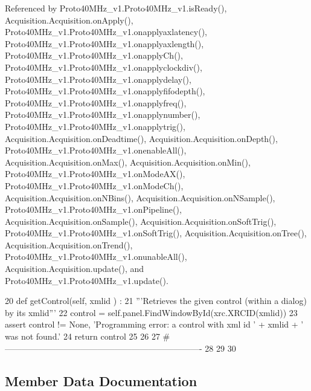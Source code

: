 Referenced by Proto40\+M\+Hz\+\_\+v1.\+Proto40\+M\+Hz\+\_\+v1.\+is\+Ready(), Acquisition.\+Acquisition.\+on\+Apply(), Proto40\+M\+Hz\+\_\+v1.\+Proto40\+M\+Hz\+\_\+v1.\+onapplyaxlatency(), Proto40\+M\+Hz\+\_\+v1.\+Proto40\+M\+Hz\+\_\+v1.\+onapplyaxlength(), Proto40\+M\+Hz\+\_\+v1.\+Proto40\+M\+Hz\+\_\+v1.\+onapply\+Ch(), Proto40\+M\+Hz\+\_\+v1.\+Proto40\+M\+Hz\+\_\+v1.\+onapplyclockdiv(), Proto40\+M\+Hz\+\_\+v1.\+Proto40\+M\+Hz\+\_\+v1.\+onapplydelay(), Proto40\+M\+Hz\+\_\+v1.\+Proto40\+M\+Hz\+\_\+v1.\+onapplyfifodepth(), Proto40\+M\+Hz\+\_\+v1.\+Proto40\+M\+Hz\+\_\+v1.\+onapplyfreq(), Proto40\+M\+Hz\+\_\+v1.\+Proto40\+M\+Hz\+\_\+v1.\+onapplynumber(), Proto40\+M\+Hz\+\_\+v1.\+Proto40\+M\+Hz\+\_\+v1.\+onapplytrig(), Acquisition.\+Acquisition.\+on\+Deadtime(), Acquisition.\+Acquisition.\+on\+Depth(), Proto40\+M\+Hz\+\_\+v1.\+Proto40\+M\+Hz\+\_\+v1.\+onenable\+All(), Acquisition.\+Acquisition.\+on\+Max(), Acquisition.\+Acquisition.\+on\+Min(), Proto40\+M\+Hz\+\_\+v1.\+Proto40\+M\+Hz\+\_\+v1.\+on\+Mode\+A\+X(), Proto40\+M\+Hz\+\_\+v1.\+Proto40\+M\+Hz\+\_\+v1.\+on\+Mode\+Ch(), Acquisition.\+Acquisition.\+on\+N\+Bins(), Acquisition.\+Acquisition.\+on\+N\+Sample(), Proto40\+M\+Hz\+\_\+v1.\+Proto40\+M\+Hz\+\_\+v1.\+on\+Pipeline(), Acquisition.\+Acquisition.\+on\+Sample(), Acquisition.\+Acquisition.\+on\+Soft\+Trig(), Proto40\+M\+Hz\+\_\+v1.\+Proto40\+M\+Hz\+\_\+v1.\+on\+Soft\+Trig(), Acquisition.\+Acquisition.\+on\+Tree(), Acquisition.\+Acquisition.\+on\+Trend(), Proto40\+M\+Hz\+\_\+v1.\+Proto40\+M\+Hz\+\_\+v1.\+onunable\+All(), Acquisition.\+Acquisition.\+update(), and Proto40\+M\+Hz\+\_\+v1.\+Proto40\+M\+Hz\+\_\+v1.\+update().


\begin{DoxyCode}
20     \textcolor{keyword}{def }getControl(self, xmlid ) :
21         \textcolor{stringliteral}{'''Retrieves the given control (within a dialog) by its xmlid'''}
22         control = self.panel.FindWindowById(xrc.XRCID(xmlid))
23         \textcolor{keyword}{assert} control != \textcolor{keywordtype}{None}, \textcolor{stringliteral}{'Programming error: a control with xml id '} + xmlid + \textcolor{stringliteral}{' was not found.'}
24         \textcolor{keywordflow}{return} control
25 
26                 
27 \textcolor{comment}{#----------------------------------------------------------------------}
28 
29     
30 \end{DoxyCode}


\subsection{Member Data Documentation}
\mbox{\label{classobject_1_1object_af114388a80cca208c152ffeca0e89e23}} 
